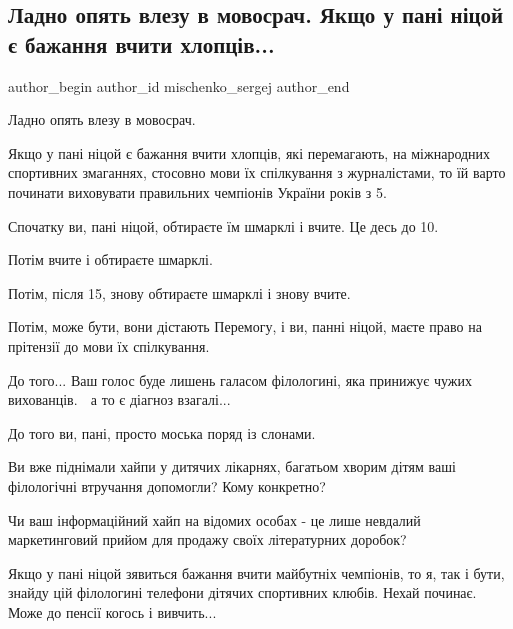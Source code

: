 
 
 
 
 
 
\subsection{Ладно опять влезу в мовосрач. Якщо у пані ніцой є бажання вчити хлопців...}
\label{sec:30_06_2021.fb.mischenko_sergej.1.movosrach_nicoj}
 
\ifcmt
 author_begin
   author_id mischenko_sergej
 author_end
\fi

Ладно опять влезу в мовосрач.

Якщо у пані ніцой є бажання вчити хлопців, які перемагають, на міжнародних
спортивних змаганнях, стосовно мови їх спілкування з журналістами, то їй варто
починати виховувати правильних чемпіонів України років з 5.

Спочатку ви, пані ніцой, обтираєте їм шмарклі і вчите. Це десь до 10.

Потім вчите і обтираєте шмарклі.

Потім, після 15, знову обтираєте шмарклі і знову вчите.

Потім, може бути, вони дістають Перемогу, і ви, панні ніцой, маєте право на
прітензії до мови їх спілкування.

До того... Ваш голос буде лишень галасом філологині, яка принижує чужих
вихованців. 🙂 а то є діагноз взагалі...

До того ви, пані, просто моська поряд із слонами.

Ви вже піднімали хайпи у дитячих лікарнях, багатьом хворим дітям ваші
філологічні втручання допомогли? Кому конкретно?

Чи ваш інформаційний хайп на відомих особах - це лише невдалий маркетинговий
прийом для продажу своїх літературних доробок? 

Якщо у пані ніцой зявиться бажання вчити майбутніх чемпіонів, то я, так і бути,
знайду цій філологині телефони дітячих спортивних клюбів. Нехай починає. Може
до пенсії когось і вивчить...
